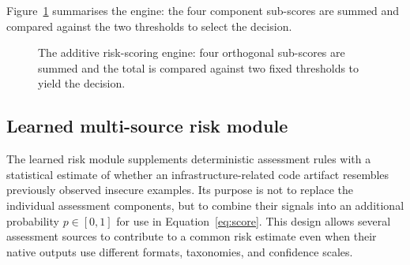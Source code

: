 Figure~\ref{fig:rs-pipeline} summarises the engine: the four component sub-scores are
summed and compared against the two thresholds to select the decision.

\begin{figure}[ht]
\centering
{}
\caption{The additive risk-scoring engine: four orthogonal sub-scores are summed and the
total is compared against two fixed thresholds to yield the decision.}
\label{fig:rs-pipeline}
\end{figure}

\subsection{Learned multi-source risk module}
\label{subsec:rs-ml}

The learned risk module supplements deterministic assessment rules with a statistical
estimate of whether an infrastructure-related code artifact resembles previously observed
insecure examples. Its purpose is not to replace the individual assessment components,
but to combine their signals into an additional probability $p \in [0,1]$ for use in
Equation~\ref{eq:score}. This design allows several assessment sources to contribute to a
common risk estimate even when their native outputs use different formats, taxonomies,
and confidence scales.

